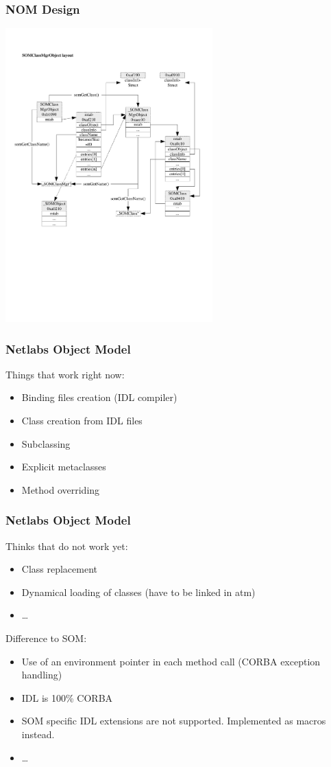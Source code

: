 \documentclass{beamer}
\begin{document}
\begin{frame}
\frametitle{NOM Design}
\includegraphics[width=8cm]{images/SOMClassMgrObject-layout.pdf}

\end{frame}

\begin{frame}
\frametitle{Netlabs Object Model}
Things that work right now:
\begin{itemize}[<+->]
  \item Binding files creation (IDL compiler)
  \item Class creation from IDL files
  \item Subclassing
  \item Explicit metaclasses
  \item Method overriding
\end{itemize}
\end{frame}

\begin{frame}
\frametitle{Netlabs Object Model}
Thinks that do not work yet:
\begin{itemize}[<+->]
  \item Class replacement
  \item Dynamical loading of classes (have to be linked in atm)
  \item \ldots
\end{itemize}
Difference to SOM:
\begin{itemize}[<+->]
  \item Use of an environment pointer in each method call (CORBA exception
  handling)
  \item IDL is 100\% CORBA
  \item SOM specific IDL extensions are not supported. Implemented as macros
  instead.
  \item \ldots
\end{itemize}
\end{frame}
\end{document}
